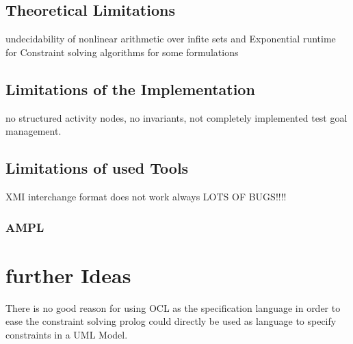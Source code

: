 \subsection{Theoretical Limitations}
undecidability of nonlinear arithmetic over infite sets and Exponential runtime for Constraint solving algorithms for some formulations
\subsection{Limitations of the Implementation}
no structured activity nodes, no invariants, not completely implemented test goal management.
\subsection{Limitations of used Tools}
XMI interchange format does not work always LOTS OF BUGS!!!!
\subsubsection{AMPL}
\label{sec:LimitationsAMPL}
\section{further Ideas}
There is no good reason for using OCL as the specification language in order to ease the constraint solving prolog could directly be used as language to specify constraints in a UML Model.


